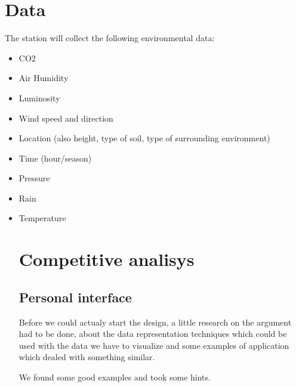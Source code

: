 \documentclass[12pt]{article} %
\begin{document}
\section{Data}
The station will collect the following environmental data:
\begin{itemize}
\item CO2
\item Air Humidity
\item Luminosity
\item Wind speed and direction 
\item Location (also height, type of soil, type of surrounding environment)
\item Time (hour/season)
\item Pressure
\item Rain
\item Temperature
\section{Competitive analisys}
\subsection{Personal interface}
Before we could actualy start the design, a little research on the argument had to be done, about the data representation techniques which could be used with the data we have to visualize and some examples of application which dealed with something similar.

We found some good examples and took some hints.

\end{itemize}
\end{document}
